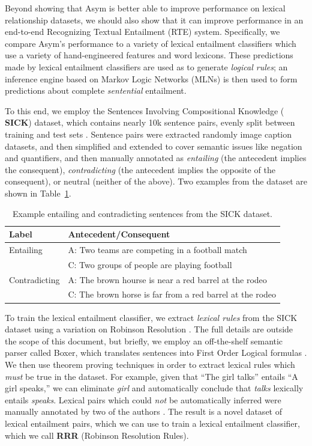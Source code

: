 \documentclass[12pt]{article}
\begin{document}
Beyond showing that Asym is better able to improve performance on lexical
relationship datasets, we should also show that it can improve performance
in an end-to-end Recognizing Textual Entailment (RTE) system. Specifically, we compare Asym's performance
to a variety of lexical entailment classifiers which use a variety of
hand-engineered features and word lexicons.  These predictions made by lexical
entailment classifiers are used as to generate {\em logical rules}; an inference
engine based on Markov Logic Networks (MLNs) is then used to form predictions
about complete {\em sentential} entailment.

To this end, we employ the Sentences Involving Compositional Knowledge ({\bf
SICK}) dataset, which contains nearly 10k sentence pairs, evenly split between
training and test sets \cite{marelli:2014:semeval}. Sentence pairs were
extracted randomly image caption datasets, and then simplified and extended to
cover semantic issues like negation and quantifiers, and then manually
annotated as {\em entailing} (the antecedent implies the consequent), {\em
contradicting} (the antecedent implies the opposite of the consequent), or
neutral (neither of the above). Two examples from the dataset are shown
in Table~\ref{tab:sickexample}.

\begin{table}
  \centering
  \begin{tabular}{|ll|}
    \hline
    {\bf Label} & {\bf Antecedent/Consequent}\\
    \hline
    Entailing & A: Two teams are competing in a football match\\
    & C: Two groups of people are playing football\\
    \hline
    Contradicting & A: The brown hourse is near a red barrel at the rodeo\\
    & C: The brown horse is far from a red barrel at the rodeo\\
    \hline
  \end{tabular}
  \caption{Example entailing and contradicting sentences from the SICK dataset.}
  \label{tab:sickexample}
\end{table}

To train the lexical entailment classifier, we extract {\em lexical rules} from
the SICK dataset using a variation on Robinson Resolution \cite{needcite}. The
full details are outside the scope of this document, but briefly, we employ
an off-the-shelf semantic parser called Boxer, which translates sentences into
First Order Logical formulas \cite{needcite}. We then use theorem proving
techniques in order to extract lexical rules which {\em must} be true in the dataset.
For example, given that ``The girl talks'' entails ``A girl speaks,'' we can
eliminate {\em girl} and automatically conclude that {\em talks} lexically
entails {\em speaks}. Lexical pairs which could {\em not} be automatically
inferred were manually annotated by two of the authors \cite{beltagy:2016:cl}.
The result is a novel dataset of lexical entailment pairs, which we can use
to train a lexical entailment classifier, which we call {\bf RRR} (Robinson
Resolution Rules).
\end{document}
